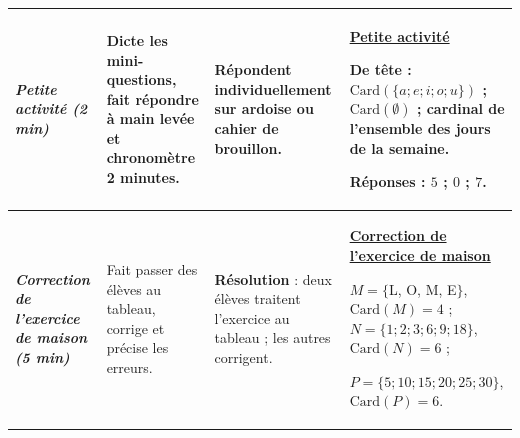 \documentclass[10pt]{article}
\newcommand{\titreR}[1]{\underline{\textcolor{rougetitre}{\bfseries #1}}}
\newcommand{\seance}[1]{\fcolorbox{bleuseance}{bleufond}{\textcolor{bleuseance}{\bfseries #1}}}
\newcommand{\moment}[1]{\textbf{\itshape #1}}
\begin{document}
\begin{longtable}{|p{2.35cm}|p{5.35cm}|p{4.55cm}|p{13.85cm}|}
\hline
\seance{SEANCE 2} \newline \moment{Petite activité (2 min)} &
Dicte les mini-questions, fait répondre à main levée et chronomètre 2 minutes. &
Répondent individuellement sur ardoise ou cahier de brouillon. &
\titreR{Petite activité} \par
De tête : $\mathrm{Card}(\{a;e;i;o;u\})$ ; \; $\mathrm{Card}(\emptyset)$ ; \;
cardinal de l'ensemble des jours de la semaine. \par
\textbf{Réponses :} $5$ ; \; $0$ ; \; $7$. \\ \hline

\moment{Correction de l'exercice de maison (5 min)} &
Fait passer des élèves au tableau, corrige et précise les erreurs. &
\textbf{Résolution} : deux élèves traitent l'exercice au tableau ; les autres corrigent. &
\titreR{Correction de l'exercice de maison} \par
$M=\{$L, O, M, E$\}$, $\mathrm{Card}(M)=4$ ; \; $N=\{1;2;3;6;9;18\}$,
$\mathrm{Card}(N)=6$ ; \par
$P=\{5;10;15;20;25;30\}$, $\mathrm{Card}(P)=6$. \\ \hline


\end{longtable}
\end{document}
